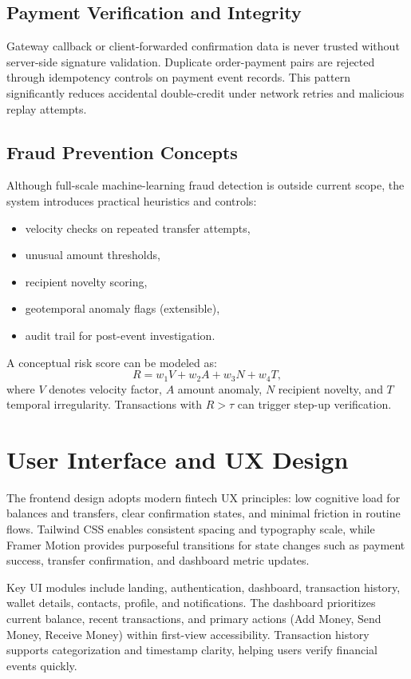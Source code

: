 \documentclass[conference]{IEEEtran}
\begin{document}
\subsection{Payment Verification and Integrity}
Gateway callback or client-forwarded confirmation data is never trusted without server-side signature validation. Duplicate order-payment pairs are rejected through idempotency controls on payment event records. This pattern significantly reduces accidental double-credit under network retries and malicious replay attempts.

\subsection{Fraud Prevention Concepts}
Although full-scale machine-learning fraud detection is outside current scope, the system introduces practical heuristics and controls:
\begin{itemize}
\item velocity checks on repeated transfer attempts,
\item unusual amount thresholds,
\item recipient novelty scoring,
\item geotemporal anomaly flags (extensible),
\item audit trail for post-event investigation.
\end{itemize}

A conceptual risk score can be modeled as:
\begin{equation}
R = w_1 V + w_2 A + w_3 N + w_4 T,
\label{eq:risk}
\end{equation}
where $V$ denotes velocity factor, $A$ amount anomaly, $N$ recipient novelty, and $T$ temporal irregularity. Transactions with $R > \tau$ can trigger step-up verification.

\section{User Interface and UX Design}
The frontend design adopts modern fintech UX principles: low cognitive load for balances and transfers, clear confirmation states, and minimal friction in routine flows. Tailwind CSS enables consistent spacing and typography scale, while Framer Motion provides purposeful transitions for state changes such as payment success, transfer confirmation, and dashboard metric updates.

Key UI modules include landing, authentication, dashboard, transaction history, wallet details, contacts, profile, and notifications. The dashboard prioritizes current balance, recent transactions, and primary actions (Add Money, Send Money, Receive Money) within first-view accessibility. Transaction history supports categorization and timestamp clarity, helping users verify financial events quickly.
\end{document}
